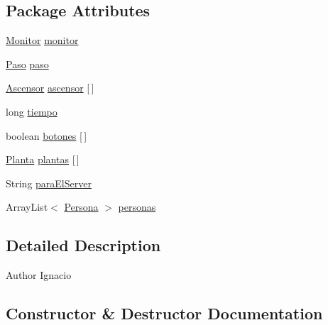 \subsection*{Package Attributes}
\begin{DoxyCompactItemize}
\item 
\mbox{\hyperlink{classpecl6part2_1_1_monitor}{Monitor}} \mbox{\hyperlink{classpecl6part2_1_1_controlador_a7fc29467f824a892431dc36c908857c7}{monitor}}
\item 
\mbox{\hyperlink{classpecl6part2_1_1_paso}{Paso}} \mbox{\hyperlink{classpecl6part2_1_1_controlador_ae07ed4d274035a923387361c19e5ce79}{paso}}
\item 
\mbox{\hyperlink{classpecl6part2_1_1_ascensor}{Ascensor}} \mbox{\hyperlink{classpecl6part2_1_1_controlador_ac2f7c4abd5447ea5daeeb7d62bf3f591}{ascensor}} \mbox{[}$\,$\mbox{]}
\item 
long \mbox{\hyperlink{classpecl6part2_1_1_controlador_af7664f9bfe62befb34d430f513b96c98}{tiempo}}
\item 
boolean \mbox{\hyperlink{classpecl6part2_1_1_controlador_a1423d58d5aa77dac81785587fadcd3eb}{botones}} \mbox{[}$\,$\mbox{]}
\item 
\mbox{\hyperlink{classpecl6part2_1_1_planta}{Planta}} \mbox{\hyperlink{classpecl6part2_1_1_controlador_a7706d274fde82fed01a03a619fbcd77c}{plantas}} \mbox{[}$\,$\mbox{]}
\item 
String \mbox{\hyperlink{classpecl6part2_1_1_controlador_a239e662ed9f4ba0e12f81e47f3f2773f}{para\+El\+Server}}
\item 
Array\+List$<$ \mbox{\hyperlink{classpecl6part2_1_1_persona}{Persona}} $>$ \mbox{\hyperlink{classpecl6part2_1_1_controlador_a570bc37c2db22f144af250ceccbbab6d}{personas}}
\end{DoxyCompactItemize}


\subsection{Detailed Description}
\begin{DoxyAuthor}{Author}
Ignacio 
\end{DoxyAuthor}


\subsection{Constructor \& Destructor Documentation}
\mbox{\label{classpecl6part2_1_1_controlador_a99e61c93190cd720977fe02b686bd34f}} 
